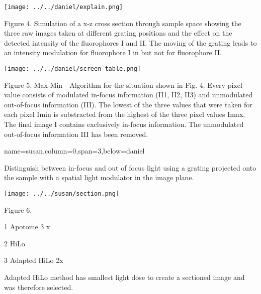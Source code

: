 \documentclass[portrait,final]{baposter}
\begin{document}
\begin{poster}
{\begin{multicols}{3}
    \begin{minipage}[h]{7.5cm}
      \vspace{-3mm}
      \begin{center}
        \texttt{[image: ../../daniel/explain.png]}
      \end{center}
      {\smaller Figure 4. Simulation of a x-z cross section through
        sample space showing the three raw images taken at different
        grating positions and the effect on the detected intensity of
        the fluorophores I and II. The moving of the grating leads to an
        intensity modulation for fluorophore I in but not for
        fluorophore II.}
    \end{minipage}
    \begin{minipage}[h]{7.5cm}
        \medskip
        \begin{center}
          \texttt{[image: ../../daniel/screen-table.png]}
        \end{center}
        {\smaller Figure 5. Max-Min - Algorithm for the situation shown in
          Fig. 4. Every pixel value consists of modulated in-focus
          information (II1, II2, II3) and unmodulated out-of-focus
          information (III). The lowest of the three values that were
          taken for each pixel Imin is substracted from the highest of the
          three pixel values Imax. The final image I contains exclusively
          in-focus information. The unmodulated out-of-focus information
          III has been removed.}
      \end{minipage}
    \end{multicols}
  }
  {name=susan,column=0,span=3,below=daniel}{
    {}
\begin{multicols}{3}
   Distinguish between in-focus and out of
   focus light using a grating projected onto the sample with a spatial
   light modulator in the image plane.
  
   \begin{minipage}[h]{7.5cm}
     \medskip
     \begin{center}
       \texttt{[image: ../../susan/section.png]}
     \end{center}
     {\smaller Figure 6. }
   \end{minipage}
   
   1 Apotome    3 x
 
   2 HiLo    

   3 Adapted HiLo   2x

   Adapted HiLo method has smallest light dose to create a sectioned
   image and was therefore selected.


\end{multicols}}
\end{poster}
\end{document}
